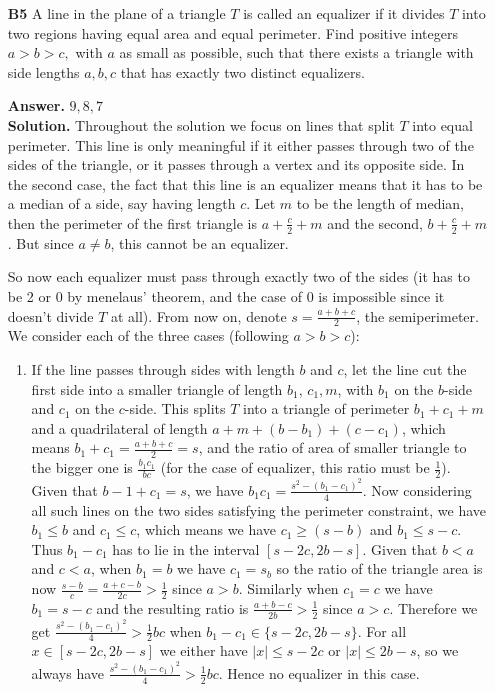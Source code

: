 \documentclass[11pt,a4paper]{article}
\begin{document}
\begin{enumerate}
\item[\textbf{B5}]A line in the plane of a triangle $T$ is called an equalizer if it divides $T$ into two regions having equal area and equal perimeter. Find positive integers $a>b>c,$ with $a$ as small as possible, such that there exists a triangle with side lengths $a,b,c$ that has exactly two distinct equalizers.

\textbf{Answer.} $9, 8, 7$ \\
\textbf{Solution.} Throughout the solution we focus on lines that split $T$ into equal perimeter. This line is only meaningful if it either passes through two of the sides of the triangle, or it passes through a vertex and its opposite side. In the second case, the fact that this line is an equalizer means that it has to be a median of a side, say having length $c$. Let $m$ to be the length of median, then the perimeter of the first triangle is $a+\frac c2+m$ and the second, $b+\frac c2 + m$. But since $a\neq b$, this cannot be an equalizer. 

So now each equalizer must pass through exactly two of the sides (it has to be 2 or 0 by menelaus' theorem, and the case of 0 is impossible since it doesn't divide $T$ at all). 
From now on, denote $s=\frac{a+b+c}{2}$, the semiperimeter. 
We consider each of the three cases (following $a>b>c$):
\begin{enumerate}
	\item If the line passes through sides with length $b$ and $c$, let the line cut the first side into a smaller triangle of length $b_1$, $c_1, m$, with $b_1$ on the $b$-side and $c_1$ on the $c$-side. This splits $T$ into a triangle of perimeter $b_1+c_1+m$ and a quadrilateral of length $a+m+(b-b_1)+(c-c_1)$, which means $b_1+c_1=\frac{a+b+c}{2}=s$, and the ratio of area of smaller triangle to the bigger one is $\frac{b_1c_1}{bc}$ (for the case of equalizer, this ratio must be $\frac 12$). Given that $b-1+c_1=s$, we have $b_1c_1=\frac{s^2-(b_1-c_1)^2}{4}$. Now considering all such lines on the two sides satisfying the perimeter constraint, we have $b_1\le b$ and $c_1\le c$, which means we have $c_1\ge (s-b)$ and $b_1\le s-c$. Thus $b_1-c_1$ has to lie in the interval $[s-2c, 2b-s]$. Given that $b<a$ and $c<a$, when $b_1=b$ we have $c_1=s_b$ so the ratio of the triangle area is now $\frac{s-b}{c}=\frac{a+c-b}{2c}>\frac 12$ since $a>b$. Similarly when $c_1=c$ we have $b_1=s-c$ and the resulting ratio is $\frac{a+b-c}{2b}>\frac 12$ since $a>c$. Therefore we get $\frac{s^2-(b_1-c_1)^2}{4}>\frac 12 bc$ when $b_1-c_1\in\{s-2c, 2b-s\}$. For all $x\in [s-2c, 2b-s]$ we either have $|x|\le s-2c$ or $|x|\le 2b-s$, so we always have $\frac{s^2-(b_1-c_1)^2}{4}>\frac 12 bc$. Hence no equalizer in this case. 
	

\end{enumerate}
\end{enumerate}
\end{document}
